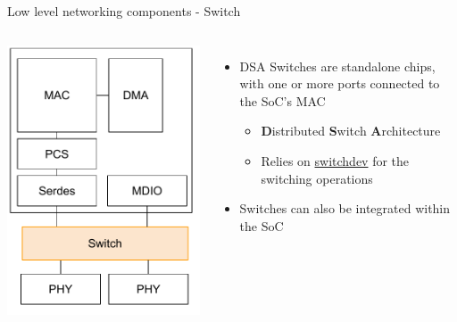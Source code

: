 \begin{frame}{Low level networking components - Switch}
	\begin{columns}
			\includegraphics[width=\textwidth]{slides/networking-driver-overview/net_components_switch.pdf}
		\begin{itemize}
			\item DSA Switches are standalone chips, with one or more ports connected to the SoC's MAC
				\begin{itemize}
					\item \textbf{D}istributed \textbf{S}witch \textbf{A}rchitecture
					\item Relies on \href{https://docs.kernel.org/networking/switchdev.html}{switchdev} for the switching operations
				\end{itemize}
			\item Switches can also be integrated within the SoC

\end{itemize}
\end{columns}
\end{frame}
